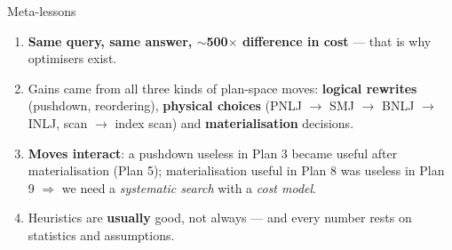 \begin{frame}{Meta-lessons}
  \begin{enumerate}
    \item \textbf{Same query, same answer, $\sim$500$\times$ difference in cost} --- that is why optimisers exist.
    \item Gains came from all three kinds of plan-space moves: \textbf{logical rewrites} (pushdown, reordering),
          \textbf{physical choices} (PNLJ $\to$ SMJ $\to$ BNLJ $\to$ INLJ, scan $\to$ index scan) and
          \textbf{materialisation} decisions.
    \item \textbf{Moves interact}: a pushdown useless in Plan 3 became useful after materialisation (Plan 5);
          materialisation useful in Plan 8 was useless in Plan 9 $\Rightarrow$ we need a \emph{systematic search} with a \emph{cost model}.
    \item Heuristics are \textbf{usually} good, not always --- and every number rests on statistics and assumptions.
  \end{enumerate}
\end{frame}
